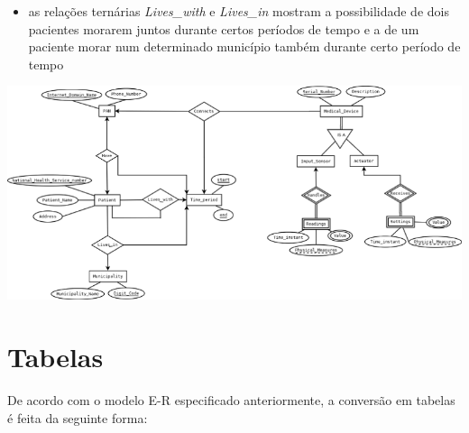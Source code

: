\documentclass[a4paper]{article}
\begin{document}
\begin{itemize}
	 \item as relações ternárias \textit{Lives\_with} e \textit{Lives\_in} mostram a possibilidade de dois pacientes morarem juntos
	 durante certos períodos de tempo e a de um paciente morar num determinado município também durante certo período de tempo
\end{itemize}
\pagebreak
\begin{landscape}
\includegraphics[keepaspectratio]{Diagrama1.png}
\end{landscape}
\pagebreak

\section{Tabelas}
De acordo com o modelo E-R especificado anteriormente, a conversão em tabelas é feita da seguinte forma:
\end{document}
